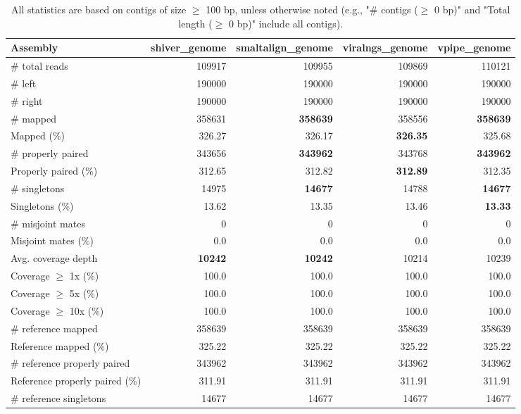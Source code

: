 \documentclass[12pt,a4paper]{article}
\begin{document}
\begin{table}[ht]
\begin{center}
\caption{All statistics are based on contigs of size $\geq$ 100 bp, unless otherwise noted (e.g., "\# contigs ($\geq$ 0 bp)" and "Total length ($\geq$ 0 bp)" include all contigs).}
\begin{tabular}{|l*{4}{|r}|}
\hline
Assembly & shiver\_genome & smaltalign\_genome & viralngs\_genome & vpipe\_genome \\ \hline
\# total reads & 109917 & 109955 & 109869 & 110121 \\ \hline
\# left & 190000 & 190000 & 190000 & 190000 \\ \hline
\# right & 190000 & 190000 & 190000 & 190000 \\ \hline
\# mapped & 358631 & {\bf 358639} & 358556 & {\bf 358639} \\ \hline
Mapped (\%) & 326.27 & 326.17 & {\bf 326.35} & 325.68 \\ \hline
\# properly paired & 343656 & {\bf 343962} & 343768 & {\bf 343962} \\ \hline
Properly paired (\%) & 312.65 & 312.82 & {\bf 312.89} & 312.35 \\ \hline
\# singletons & 14975 & {\bf 14677} & 14788 & {\bf 14677} \\ \hline
Singletons (\%) & 13.62 & 13.35 & 13.46 & {\bf 13.33} \\ \hline
\# misjoint mates & 0 & 0 & 0 & 0 \\ \hline
Misjoint mates (\%) & 0.0 & 0.0 & 0.0 & 0.0 \\ \hline
Avg. coverage depth & {\bf 10242} & {\bf 10242} & 10214 & 10239 \\ \hline
Coverage $\geq$ 1x (\%) & 100.0 & 100.0 & 100.0 & 100.0 \\ \hline
Coverage $\geq$ 5x (\%) & 100.0 & 100.0 & 100.0 & 100.0 \\ \hline
Coverage $\geq$ 10x (\%) & 100.0 & 100.0 & 100.0 & 100.0 \\ \hline
\# reference mapped & 358639 & 358639 & 358639 & 358639 \\ \hline
Reference mapped (\%) & 325.22 & 325.22 & 325.22 & 325.22 \\ \hline
\# reference properly paired & 343962 & 343962 & 343962 & 343962 \\ \hline
Reference properly paired (\%) & 311.91 & 311.91 & 311.91 & 311.91 \\ \hline
\# reference singletons & 14677 & 14677 & 14677 & 14677 \\ \hline

\end{tabular}
\end{center}
\end{table}
\end{document}
